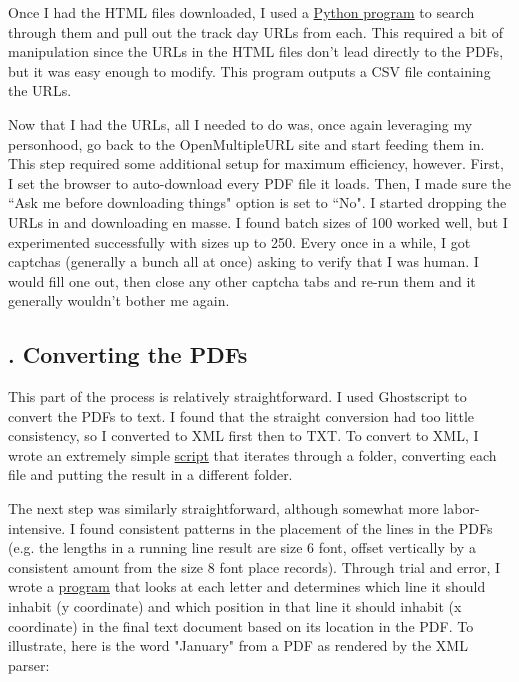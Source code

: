 \documentclass{article}
\begin{document}
Once I had the HTML files downloaded, I used a \href{https://github.com/Real-Karisch/horseData/blob/master/python/convertPDF/webScrape/saveTrackUrlsFromFiles.py}{Python program} to search through them and pull out the track day URLs from each. This required a bit of manipulation since the URLs in the HTML files don't lead directly to the PDFs, but it was easy enough to modify. This program outputs a CSV file containing the URLs.

Now that I had the URLs, all I needed to do was, once again leveraging my personhood, go back to the OpenMultipleURL site and start feeding them in. This step required some additional setup for maximum efficiency, however. First, I set the browser to auto-download every PDF file it loads. Then, I made sure the ``Ask me before downloading things" option is set to ``No". I started dropping the URLs in and downloading en masse. I found batch sizes of 100 worked well, but I experimented successfully with sizes up to 250. Every once in a while, I got captchas (generally a bunch all at once) asking to verify that I was human. I would fill one out, then close any other captcha tabs and re-run them and it generally wouldn't bother me again.

\subsection*{. Converting the PDFs}

This part of the process is relatively straightforward. I used Ghostscript to convert the PDFs to text. I found that the straight conversion had too little consistency, so I converted to XML first then to TXT. To convert to XML, I wrote an extremely simple \href{https://github.com/Real-Karisch/horseData/blob/master/python/convertPDF/webScrape/pdf2xml.py}{script} that iterates through a folder, converting each file and putting the result in a different folder.

The next step was similarly straightforward, although somewhat more labor-intensive. I found consistent patterns in the placement of the lines in the PDFs (e.g. the lengths in a running line result are size 6 font, offset vertically by a consistent amount from the size 8 font place records). Through trial and error, I wrote a \href{https://github.com/Real-Karisch/horseData/blob/master/python/convertPDF/webScrape/xml2txt.py}{program} that looks at each letter and determines which line it should inhabit (y coordinate) and which position in that line it should inhabit (x coordinate) in the final text document based on its location in the PDF. To illustrate, here is the word "January" from a PDF as rendered by the XML parser:
\bigbreak
\end{document}
